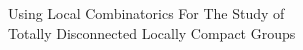 \documentclass[preview]{standalone}
\begin{document}
\begin{center}
Using Local Combinatorics For The Study of \\ Totally Disconnected Locally Compact Groups
\end{center}
\end{document}
